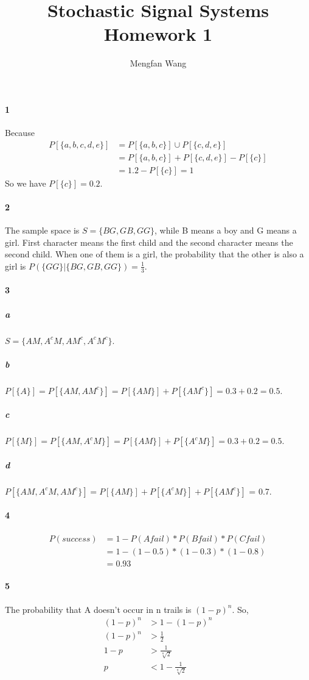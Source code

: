 \documentclass[22pt]{article}
\author{Mengfan Wang}
\title{Stochastic Signal Systems Homework 1}
\begin{document}
		\maketitle 
	\paragraph{1} Because
	\begin{align}
	P[\{a,b,c,d,e\}] & = P[\{a,b,c\}] \cup P[\{c,d,e\}]\\
	 & = P[\{a,b,c\}] + P[\{c,d,e\}] -P[\{c\}]\\
	 & = 1.2 - P[\{c\}] = 1
	\end{align}
	So we have $P[\{c\}] = 0.2$.

	\paragraph{2}The sample space is $S = \{BG,GB,GG\}$, while B means a boy and G means a girl. First character means the first child and the second character means the second child. When one of them is a girl, the probability that the other is also a girl is $P(\{GG\}|\{BG,GB,GG\}) = \frac{1}{3}$. 

	\paragraph{3}
	 	\subparagraph{a} $S = \{AM,A^cM,AM^c,A^cM^c\}$.
	 	\subparagraph{b} $P[\{A\}] = P[\{AM,AM^c\}] = P[\{AM\}] + P[\{AM^c\}] = 0.3 + 0.2 = 0.5$.
	 	\subparagraph{c} $P[\{M\}] = P[\{AM,A^cM\}] = P[\{AM\}] + P[\{A^cM\}] = 0.3 + 0.2 = 0.5$.
	 	\subparagraph{d} $P[\{AM,A^cM,AM^c\}] = P[\{AM\}] + P[\{A^cM\}] + P[\{AM^c\}]$ = 0.7.

	\paragraph{4} \begin{align}
	P(success) & = 1 - P(Afail)*P(Bfail)*P(Cfail)\\
	& = 1- (1-0.5)*(1-0.3)*(1-0.8)\\
	& = 0.93
	\end{align}

	\paragraph{5}
	The probability that A doesn't occur in n trails is $(1-p)^n$. So,
	\begin{align}
	 (1-p)^n  & > 1 - (1-p)^n \\
	 (1- p)^n & > \frac{1}{2}\\
	 1-p &> \frac{1}{\sqrt[n]{2}}\\
	 p&<1-\frac{1}{\sqrt[n]{2}}
	\end{align}
\end{document}
